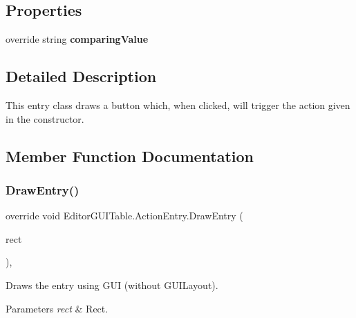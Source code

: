 \subsection*{Properties}
\begin{DoxyCompactItemize}
\item 
\mbox{\label{class_editor_g_u_i_table_1_1_action_entry_ab7ea5f66038bfda1150c35f1161b11df}} 
override string {\bfseries comparing\+Value}
\end{DoxyCompactItemize}


\subsection{Detailed Description}
This entry class draws a button which, when clicked, will trigger the action given in the constructor. 



\subsection{Member Function Documentation}
\mbox{\label{class_editor_g_u_i_table_1_1_action_entry_a84dfbc114f27c8108899c3c25803ae60}} 
\subsubsection{\texorpdfstring{Draw\+Entry()}{DrawEntry()}}
{\footnotesize\ttfamily override void Editor\+G\+U\+I\+Table.\+Action\+Entry.\+Draw\+Entry (\begin{DoxyParamCaption}\item[{Rect}]{rect }\end{DoxyParamCaption})\hspace{0.3cm}{\ttfamily [inline]}, {\ttfamily [virtual]}}



Draws the entry using G\+UI (without G\+U\+I\+Layout). 


\begin{DoxyParams}{Parameters}
{\em rect} & Rect.\\
\hline
\end{DoxyParams}


